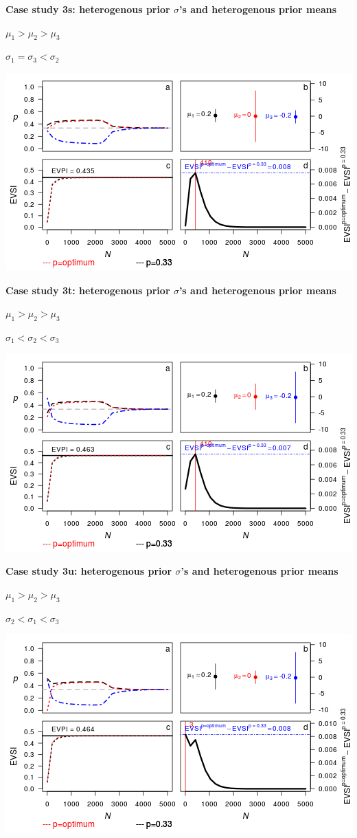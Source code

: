 \textbf{Case study 3s: heterogenous prior \(\sigma\)'s and heterogenous
prior means}

\(\mu_1 > \mu_2 > \mu_3\)

\(\sigma_1 = \sigma_3 < \sigma_2\)

\includegraphics{figure/x10n1_1__1_1c-1.png} \clearpage

\textbf{Case study 3t: heterogenous prior \(\sigma\)'s and heterogenous
prior means}

\(\mu_1 > \mu_2 > \mu_3\)

\(\sigma_1 < \sigma_2 < \sigma_3\)

\includegraphics{figure/x10n1_1__1___1c-1.png} \clearpage  

\textbf{Case study 3u: heterogenous prior \(\sigma\)'s and heterogenous
prior means}

\(\mu_1 > \mu_2 > \mu_3\)

\(\sigma_2 < \sigma_1 < \sigma_3\)

\includegraphics{figure/x10n1__1_1___1c-1.png} \clearpage

